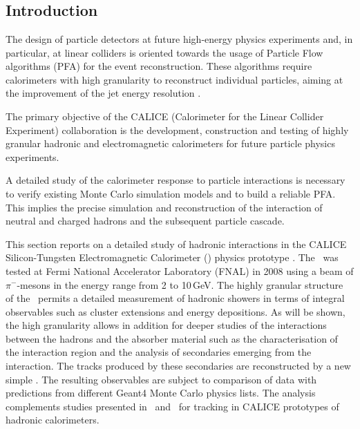 \section{\ecalp}
\subsection{Introduction}
\label{sec:ecalintro}
The design of particle detectors at future high-energy physics experiments and, in particular, at linear colliders is oriented towards the usage of Particle Flow algorithms (PFA) for the event reconstruction. 
These algorithms require calorimeters with high granularity to reconstruct individual particles, aiming at the improvement of the jet energy resolution \cite{Brient:2002gh}. 

The primary objective of the CALICE (Calorimeter for the Linear Collider Experiment) collaboration is the development, construction and testing of highly granular hadronic and electromagnetic  calorimeters for future particle physics experiments.

A detailed study of the calorimeter response to particle interactions is necessary to verify existing Monte Carlo simulation models and to build a reliable PFA. 
This implies the precise simulation and reconstruction of the interaction of neutral and charged hadrons and the subsequent particle cascade.

This section reports on a detailed study of hadronic interactions in the CALICE Silicon-Tungsten Electromagnetic Calorimeter (\ecal) physics prototype \cite{Anduze:2008hq}.
The \ecal\ was tested at Fermi National Accelerator Laboratory (FNAL) in 2008 using a beam of $\pi^-$-mesons in the energy range from 2 to 10\,GeV. 
The highly granular structure of the \ecal\ permits a detailed measurement of hadronic showers in terms of integral observables \cite{Bilki:2014uep} such as cluster extensions and energy depositions. As will be shown, the high granularity allows in addition for deeper studies of the interactions between the hadrons and the absorber material such as the characterisation of the interaction region and the analysis of secondaries emerging from the interaction. The tracks produced by these secondaries are reconstructed by a new simple \tfa . The resulting observables are subject to comparison of data with predictions from different {\sc Geant}4 Monte Carlo physics lists. The analysis complements studies presented in~\cite{Adloff:2013vra} and~\cite{bib:can-047} for tracking in CALICE prototypes of hadronic calorimeters.  

